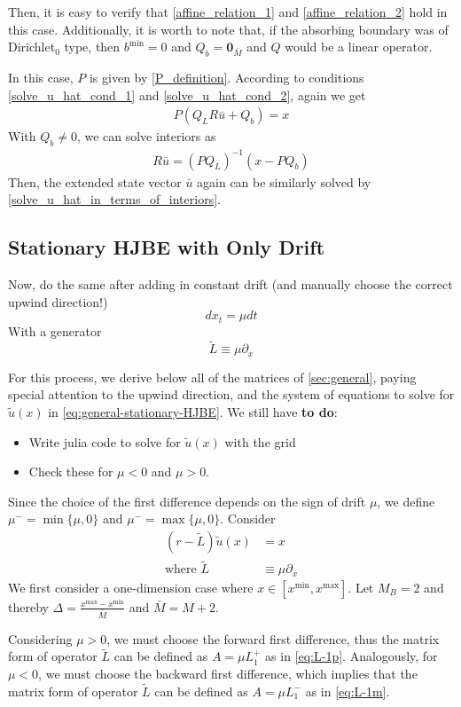 \documentclass[11pt]{article}
\newcommand{\D}[1][]{\ensuremath{\partial_{#1}}}
\begin{document}
Then, it is easy to verify that \eqref{affine_relation_1} and \eqref{affine_relation_2} hold in this case. Additionally, it is worth to note that, if the absorbing boundary was of Dirichlet$_0$ type, then $b^{\min} = 0$ and $Q_b = \mathbf{0}_{\bar{M}}$ and $Q$ would be a linear operator.

In this case, $P$ is given by \eqref{P_definition}. According to conditions \eqref{solve_u_hat_cond_1} and \eqref{solve_u_hat_cond_2}, again we get
\begin{align}
P(Q_L R \bar{u}+Q_b) = x
\end{align}
With $Q_b\neq 0$, we can solve interiors as
\begin{align}
R\bar{u} = (P Q_L)^{-1}(x-P Q_b)
\end{align}
Then, the extended state vector $\bar{u}$ again can be similarly solved by \eqref{solve_u_hat_in_terms_of_interiors}.
\subsection{Stationary HJBE with Only Drift}
Now, do the same after adding in constant drift (and manually choose the correct upwind direction!)
$$
d x_t = \mu dt
$$
With a generator
$$
	\tilde{L} \equiv \mu \D[x]
$$

For this process, we derive below all of the matrices of \cref{sec:general}, paying special attention to the upwind direction, and the system of equations to solve for $\tilde{u}(x)$ in \cref{eq:general-stationary-HJBE}. We still have \textbf{to do}:
\begin{itemize}
	\item Write julia code to solve for $\tilde{u}(x)$ with the grid
	\item Check these for $\mu < 0$ and $\mu > 0$.
\end{itemize}

Since the choice of the first difference depends on the sign of drift $\mu$, we define $\mu^- =\min\{\mu, 0\}$ and $\mu^- =\max\{\mu, 0\}$.
Consider
\begin{align}
(r - \tilde{L} )\tilde{u}(x) &= x\label{HJBE_PDE_with_drifts}\\
\text{where }\tilde{L}&\equiv \mu\partial_{x}
\end{align}
We first consider a one-dimension case where $x\in [x^{\min},x^{\max}]$. Let $M_B = 2$ and thereby $\Delta  = \frac{x^{\max}-x^{\min}}{\bar{M}}$ and $\bar{M} = M+2$.

Considering $\mu>0$, we must choose the forward first difference, thus the matrix form of operator $\tilde{L}$ can be defined as $A = \mu L_1^+$ as in \eqref{eq:L-1p}. Analogously, for $\mu<0$, we must choose the backward first difference, which implies that the matrix form of operator $\tilde{L}$ can be defined as $A = \mu L_1^-$ as in \eqref{eq:L-1m}.
\end{document}
